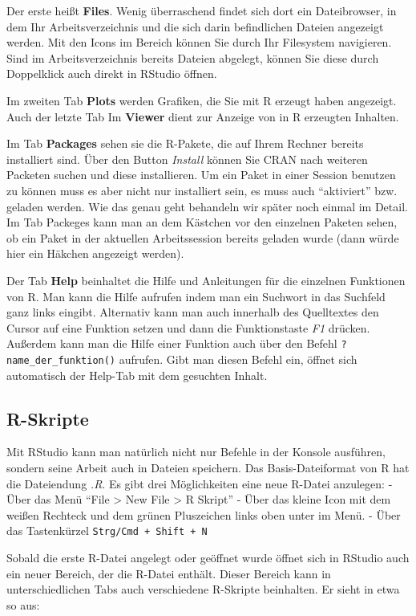 \documentclass[
]{book}
\begin{document}
Der erste heißt \textbf{Files}. Wenig überraschend findet sich dort ein Dateibrowser, in dem Ihr Arbeitsverzeichnis und die sich darin befindlichen Dateien angezeigt werden.
Mit den Icons im Bereich können Sie durch Ihr Filesystem navigieren.
Sind im Arbeitsverzeichnis bereits Dateien abgelegt, können Sie diese durch Doppelklick auch direkt in RStudio öffnen.

Im zweiten Tab \textbf{Plots} werden Grafiken, die Sie mit R erzeugt haben angezeigt.
Auch der letzte Tab Im \textbf{Viewer} dient zur Anzeige von in R erzeugten Inhalten.

Im Tab \textbf{Packages} sehen sie die R-Pakete, die auf Ihrem Rechner bereits installiert sind.
Über den Button \emph{Install} können Sie CRAN nach weiteren Packeten suchen und diese installieren.
Um ein Paket in einer Session benutzen zu können muss es aber nicht nur installiert sein, es muss auch ``aktiviert'' bzw. geladen werden. Wie das genau geht behandeln wir später noch einmal im Detail.
Im Tab Packeges kann man an dem Kästchen vor den einzelnen Paketen sehen, ob ein Paket in der aktuellen Arbeitssession bereits geladen wurde (dann würde hier ein Häkchen angezeigt werden).

Der Tab \textbf{Help} beinhaltet die Hilfe und Anleitungen für die einzelnen Funktionen von R.
Man kann die Hilfe aufrufen indem man ein Suchwort in das Suchfeld ganz links eingibt. Alternativ kann man auch innerhalb des Quelltextes den Cursor auf eine Funktion setzen und dann die Funktionstaste \emph{F1} drücken.
Außerdem kann man die Hilfe einer Funktion auch über den Befehl \texttt{?name\_der\_funktion()} aufrufen. Gibt man diesen Befehl ein, öffnet sich automatisch der Help-Tab mit dem gesuchten Inhalt.

\hypertarget{r-skripte}{%
\subsection{R-Skripte}\label{r-skripte}}

Mit RStudio kann man natürlich nicht nur Befehle in der Konsole ausführen, sondern seine Arbeit auch in Dateien speichern. Das Basis-Dateiformat von R hat die Dateiendung \emph{.R}. Es gibt drei Möglichkeiten eine neue R-Datei anzulegen:
- Über das Menü ``File \textgreater{} New File \textgreater{} R Skript''
- Über das kleine Icon mit dem weißen Rechteck und dem grünen Pluszeichen links oben unter im Menü.
- Über das Tastenkürzel \texttt{Strg/Cmd\ +\ Shift\ +\ N}

Sobald die erste R-Datei angelegt oder geöffnet wurde öffnet sich in RStudio auch ein neuer Bereich, der die R-Datei enthält. Dieser Bereich kann in unterschiedlichen Tabs auch verschiedene R-Skripte beinhalten. Er sieht in etwa so aus:
\end{document}
